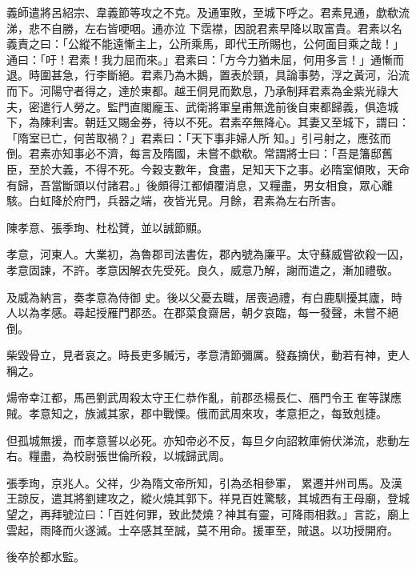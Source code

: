 \begin{pinyinscope}
 義師遣將呂紹宗、韋義節等攻之不克。及通軍敗，至城下呼之。君素見通，歔欷流涕，悲不自勝，左右皆哽咽。通亦泣
 下霑襟，因說君素早降以取富貴。君素以名義責之曰：「公縱不能遠慚主上，公所乘馬，即代王所賜也，公何面目乘之哉！」通曰：「吁！君素！我力屈而來。」君素曰：「方今力猶未屈，何用多言！」通慚而退。時圍甚急，行李斷絕。君素乃為木鵝，置表於頸，具論事勢，浮之黃河，沿流而下。河陽守者得之，達於東都。越王侗見而歎息，乃承制拜君素為金紫光祿大夫，密遣行人勞之。監門直閣龐玉、武衛將軍皇甫無逸前後自東都歸義，俱造城下，為陳利害。朝廷又賜金券，待以不死。君素卒無降心。其妻又至城下，謂曰：「隋室已亡，何苦取禍？」君素曰：「天下事非婦人所
 知。」引弓射之，應弦而倒。君素亦知事必不濟，每言及隋國，未嘗不歔欷。常謂將士曰：「吾是籓邸舊臣，至於大義，不得不死。今穀支數年，食盡，足知天下之事。必隋室傾敗，天命有歸，吾當斷頭以付諸君。」後頗得江都傾覆消息，又糧盡，男女相食，眾心離駭。白虹降於府門，兵器之端，夜皆光見。月餘，君素為左右所害。



 陳孝意、張季珣、杜松贇，並以誠節顯。



 孝意，河東人。大業初，為魯郡司法書佐，郡內號為廉平。太守蘇威嘗欲殺一囚，孝意固諫，不許。孝意因解衣先受死。良久，威意乃解，謝而遣之，漸加禮敬。



 及威為納言，奏孝意為侍御
 史。後以父憂去職，居喪過禮，有白鹿馴擾其廬，時人以為孝感。尋起授雁門郡丞。在郡菜食齋居，朝夕哀臨，每一發聲，未嘗不絕倒。



 柴毀骨立，見者哀之。時長吏多贓污，孝意清節彌厲。發姦摘伏，動若有神，吏人稱之。



 煬帝幸江都，馬邑劉武周殺太守王仁恭作亂，前郡丞楊長仁、鴈門令王隺等謀應賊。孝意知之，族滅其家，郡中戰慄。俄而武周來攻，孝意拒之，每致剋捷。



 但孤城無援，而孝意誓以必死。亦知帝必不反，每旦夕向詔敕庫俯伏涕流，悲動左右。糧盡，為校尉張世倫所殺，以城歸武周。



 張季珣，京兆人。父祥，少為隋文帝所知，引為丞相參軍，
 累遷并州司馬。及漢王諒反，遣其將劉建攻之，縱火燒其郭下。祥見百姓驚駭，其城西有王母廟，登城望之，再拜號泣曰：「百姓何罪，致此焚燒？神其有靈，可降雨相救。」言訖，廟上雲起，雨降而火遂滅。士卒感其至誠，莫不用命。援軍至，賊退。以功授開府。



 後卒於都水監。




\end{pinyinscope}
